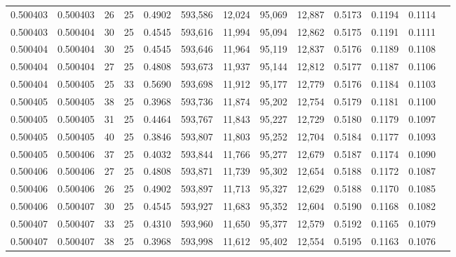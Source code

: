 \begin{tabular}{rrrrrrrrrrrrr}
0.500403 & 0.500403 &    26 &  25 &                                     0.4902 & 593,586 &  12,024 &  95,069 &  12,887 & 0.5173 & 0.1194 & 0.1114 \\
0.500403 & 0.500404 &    30 &  25 &                                     0.4545 & 593,616 &  11,994 &  95,094 &  12,862 & 0.5175 & 0.1191 & 0.1111 \\
0.500404 & 0.500404 &    30 &  25 &                                     0.4545 & 593,646 &  11,964 &  95,119 &  12,837 & 0.5176 & 0.1189 & 0.1108 \\
0.500404 & 0.500404 &    27 &  25 &                                     0.4808 & 593,673 &  11,937 &  95,144 &  12,812 & 0.5177 & 0.1187 & 0.1106 \\
0.500404 & 0.500405 &    25 &  33 &                                     0.5690 & 593,698 &  11,912 &  95,177 &  12,779 & 0.5176 & 0.1184 & 0.1103 \\
0.500405 & 0.500405 &    38 &  25 &                                     0.3968 & 593,736 &  11,874 &  95,202 &  12,754 & 0.5179 & 0.1181 & 0.1100 \\
0.500405 & 0.500405 &    31 &  25 &                                     0.4464 & 593,767 &  11,843 &  95,227 &  12,729 & 0.5180 & 0.1179 & 0.1097 \\
0.500405 & 0.500405 &    40 &  25 &                                     0.3846 & 593,807 &  11,803 &  95,252 &  12,704 & 0.5184 & 0.1177 & 0.1093 \\
0.500405 & 0.500406 &    37 &  25 &                                     0.4032 & 593,844 &  11,766 &  95,277 &  12,679 & 0.5187 & 0.1174 & 0.1090 \\
0.500406 & 0.500406 &    27 &  25 &                                     0.4808 & 593,871 &  11,739 &  95,302 &  12,654 & 0.5188 & 0.1172 & 0.1087 \\
0.500406 & 0.500406 &    26 &  25 &                                     0.4902 & 593,897 &  11,713 &  95,327 &  12,629 & 0.5188 & 0.1170 & 0.1085 \\
0.500406 & 0.500407 &    30 &  25 &                                     0.4545 & 593,927 &  11,683 &  95,352 &  12,604 & 0.5190 & 0.1168 & 0.1082 \\
0.500407 & 0.500407 &    33 &  25 &                                     0.4310 & 593,960 &  11,650 &  95,377 &  12,579 & 0.5192 & 0.1165 & 0.1079 \\
0.500407 & 0.500407 &    38 &  25 &                                     0.3968 & 593,998 &  11,612 &  95,402 &  12,554 & 0.5195 & 0.1163 & 0.1076 \\

\end{tabular}
